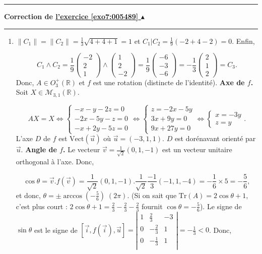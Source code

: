 \documentclass[11pt,a4paper]{article}
\newcommand{\Rr}{\mathbb{R}} \newcommand{\R}{\mathbb{R}}
\newcommand{\Arccos}{\mathop{\mathrm{arccos}}\nolimits}
\newcounter{exo}
\newcommand{\correction}[1]{\hypertarget{cor7:#1}{}\label{cor7:#1}{\bf Correction de \hyperlink{exo7:#1}{l'exercice \ref{exo7:#1} $\blacktriangle$}}\vspace{1mm}\hrule\vspace{1mm}}
\newcommand{\fincorrection}{\vspace{1mm}\hrule\vspace*{7mm}}
\begin{document}
\fincorrection
\correction{005489}
\begin{enumerate}
 \item  $\|C_1\|=\|C_2\|=\frac{1}{3}\sqrt{4+4+1}=1$ et $C_1|C_2=\frac{1}{9}(-2+4-2)=0$. Enfin, 

$$C_1\wedge C_2=\frac{1}{9}\left(
\begin{array}{c}
-2\\
2\\
1
\end{array}
\right)\wedge\left(
\begin{array}{c}
1\\
2\\
-2
\end{array}
\right)
=\frac{1}{9}\left(
\begin{array}{c}
-6\\
-3\\
-6
\end{array}
\right)=-\frac{1}{3}\left(
\begin{array}{c}
2\\
1\\
2
\end{array}
\right)=C_3.$$ 
Donc, $A\in O_3^+(\Rr)$ et $f$ est une rotation (distincte de l'identité).
\textbf{Axe de $f$.} Soit $X\in\mathcal{M}_{3,1}(\Rr)$.

$$AX=X\Leftrightarrow\left\{
\begin{array}{l}
-x-y-2z=0\\
-2x-5y-z=0\\
-x+2y-5z=0
\end{array}
\right.\Leftrightarrow\left\{
\begin{array}{l}
z=-2x-5y\\
3x+9y=0\\
9x+27y=0
\end{array}
\right.\Leftrightarrow\left\{
\begin{array}{l}
x=-3y\\
z=y
\end{array}
\right..$$ 
L'axe $D$ de $f$ est $\mbox{Vect}(\overrightarrow{u})$ où $\overrightarrow{u}=(-3,1,1)$. $D$ est dorénavant orienté par $\overrightarrow{u}$.
\textbf{Angle de $f$.} Le vecteur $\overrightarrow{v}=\frac{1}{\sqrt{2}}(0,1,-1)$ est un vecteur unitaire orthogonal à l'axe. Donc,

$$\cos\theta=\overrightarrow{v}.f(\overrightarrow{v})=\frac{1}{\sqrt{2}}(0,1,-1).\frac{1}{\sqrt{2}}\frac{-1}{3}(-1,1,-4)=-\frac{1}{6}\times5
=-\frac{5}{6},$$
et donc, $\theta=\pm\Arccos(-\frac{5}{6})\;(2\pi)$. (Si on sait que $\text{Tr}(A)=2\cos\theta+1$, c'est plus court : $2\cos\theta+1=\frac{2}{3}-\frac{2}{3}-\frac{2}{3}$ fournit $\cos\theta=-\frac{5}{6}$).
Le signe de $\sin\theta$ est le signe de $[\overrightarrow{i},f(\overrightarrow{i}),\overrightarrow{u}]=\left|
\begin{array}{ccc}
1&\frac{2}{3}&-3\\
0&-\frac{2}{3}&1\\
0&-\frac{1}{3}&1\\
\end{array}
\right|=-\frac{1}{3}<0$. Donc, 


\end{enumerate}
\end{document}
